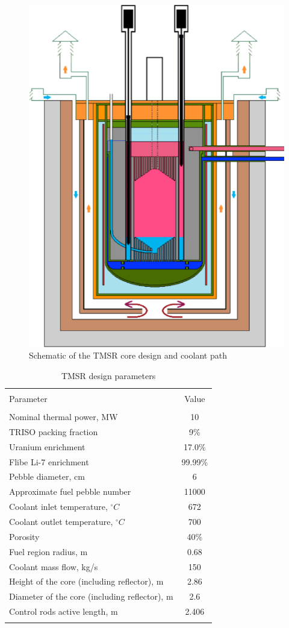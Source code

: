 \documentclass{elsarticle}
\newcommand{\degc}{{\ensuremath{^{\circ}C}}}
\begin{document}
\begin{figure}[h]
    \centering
    \includegraphics[width=0.6\columnwidth]{./images/design/TMSR_geom.png}
    \caption{Schematic of the TMSR core design and coolant path}
    \label{fig:TMSR}
\end{figure}

\begin{table}
  \centering
  \begin{tabular}{lc}
     \hline\\
     Parameter & Value \\
     \hline\\
     Nominal thermal power, MW & 10\\
     TRISO packing fraction & 9\% \\
     Uranium enrichment & 17.0\% \\
     Flibe Li-7 enrichment & 99.99\% \\
     Pebble diameter, cm & 6\\
     Approximate fuel pebble number& 11000\\
   Coolant inlet temperature, \degc& 672\\
   Coolant outlet temperature, \degc& 700\\
   Porosity & 40\% \\
   Fuel region radius, m& 0.68\\
   Coolant mass flow, kg/s & 150\\
   Height of the core (including reflector), m & 2.86\\
   Diameter of the core (including reflector), m & 2.6\\
   Control rods active length, m & 2.406\\
     \hline\\
  \end{tabular}
  \caption{TMSR design parameters}
  \label{tab:tmsr_design}
\end{table}
\end{document}
